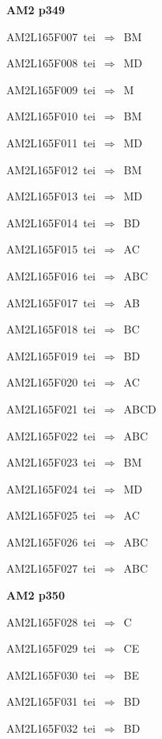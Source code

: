 \par\vfill\eject
{\bf\hfill AM2 p349\hfill\hbox{}}\par\bigskip
{\sixrm AM2L165F007\ {\sixit tei}\ }$\Rightarrow$\ BM\par\smallskip
{\sixrm AM2L165F008\ {\sixit tei}\ }$\Rightarrow$\ MD\par\smallskip
{\sixrm AM2L165F009\ {\sixit tei}\ }$\Rightarrow$\ M\par\smallskip
{\sixrm AM2L165F010\ {\sixit tei}\ }$\Rightarrow$\ BM\par\smallskip
{\sixrm AM2L165F011\ {\sixit tei}\ }$\Rightarrow$\ MD\par\smallskip
{\sixrm AM2L165F012\ {\sixit tei}\ }$\Rightarrow$\ BM\par\smallskip
{\sixrm AM2L165F013\ {\sixit tei}\ }$\Rightarrow$\ MD\par\smallskip
{\sixrm AM2L165F014\ {\sixit tei}\ }$\Rightarrow$\ BD\par\smallskip
{\sixrm AM2L165F015\ {\sixit tei}\ }$\Rightarrow$\ AC\par\smallskip
{\sixrm AM2L165F016\ {\sixit tei}\ }$\Rightarrow$\ ABC\par\smallskip
{\sixrm AM2L165F017\ {\sixit tei}\ }$\Rightarrow$\ AB\par\smallskip
{\sixrm AM2L165F018\ {\sixit tei}\ }$\Rightarrow$\ BC\par\smallskip
{\sixrm AM2L165F019\ {\sixit tei}\ }$\Rightarrow$\ BD\par\smallskip
{\sixrm AM2L165F020\ {\sixit tei}\ }$\Rightarrow$\ AC\par\smallskip
{\sixrm AM2L165F021\ {\sixit tei}\ }$\Rightarrow$\ ABCD\par\smallskip
{\sixrm AM2L165F022\ {\sixit tei}\ }$\Rightarrow$\ ABC\par\smallskip
{\sixrm AM2L165F023\ {\sixit tei}\ }$\Rightarrow$\ BM\par\smallskip
{\sixrm AM2L165F024\ {\sixit tei}\ }$\Rightarrow$\ MD\par\smallskip
{\sixrm AM2L165F025\ {\sixit tei}\ }$\Rightarrow$\ AC\par\smallskip
{\sixrm AM2L165F026\ {\sixit tei}\ }$\Rightarrow$\ ABC\par\smallskip
{\sixrm AM2L165F027\ {\sixit tei}\ }$\Rightarrow$\ ABC\par\smallskip

\par\vfill\eject
{\bf\hfill AM2 p350\hfill\hbox{}}\par\bigskip
{\sixrm AM2L165F028\ {\sixit tei}\ }$\Rightarrow$\ C\par\smallskip
{\sixrm AM2L165F029\ {\sixit tei}\ }$\Rightarrow$\ CE\par\smallskip
{\sixrm AM2L165F030\ {\sixit tei}\ }$\Rightarrow$\ BE\par\smallskip
{\sixrm AM2L165F031\ {\sixit tei}\ }$\Rightarrow$\ BD\par\smallskip
{\sixrm AM2L165F032\ {\sixit tei}\ }$\Rightarrow$\ BD\par\smallskip

